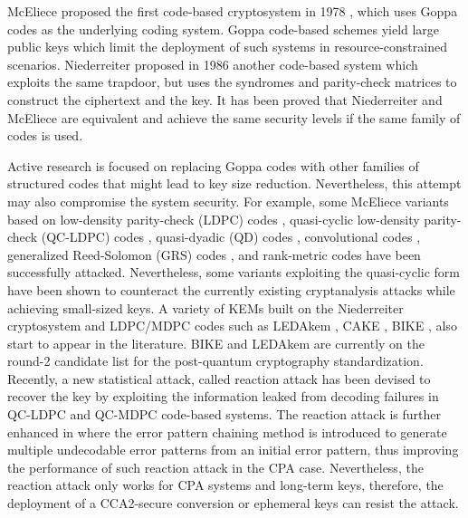 \documentclass[preprint]{iacrtrans}
\begin{document}
McEliece proposed the first code-based cryptosystem in 1978 \cite{mceliece1978public}, which uses  Goppa codes \cite{goppa1970new} as the underlying coding system. Goppa code-based schemes yield large public keys which limit the deployment of such systems in resource-constrained scenarios. Niederreiter proposed in 1986 another code-based system \cite{niederreiter1986knapsack} which exploits the same trapdoor, but uses the syndromes and parity-check matrices to construct the ciphertext and the key. It has been proved that Niederreiter and McEliece are equivalent \cite{li1994equivalence} and achieve the same security levels if the same family of codes is used.

Active research is focused on replacing Goppa codes with other families of structured codes that might lead to key size reduction. Nevertheless, this attempt may also compromise the system security. For example, some McEliece variants based on low-density parity-check (LDPC) codes \cite{monico2000using}, quasi-cyclic low-density parity-check (QC-LDPC) codes \cite{otmani2010cryptanalysis}, quasi-dyadic (QD) codes \cite{misoczki2009compact}, convolutional codes \cite{londahl2012new}, generalized Reed-Solomon (GRS) codes \cite{baldi2016enhanced}, and rank-metric codes \cite{loidreau2017new,gaborit2018polynomial} have been successfully attacked. Nevertheless, some variants exploiting the quasi-cyclic form  \cite{baldi2013optimization,baldi2008new,misoczki2013mdpc} have been shown to counteract the currently existing cryptanalysis attacks while achieving small-sized keys. A variety of KEMs built on the Niederreiter cryptosystem and LDPC/MDPC codes such as LEDAkem \cite{baldi2018ledakem}, CAKE \cite{barreto2017cake}, BIKE \cite{aragon2017bike}, also start to appear in the literature. BIKE and LEDAkem are currently on the round-2 candidate list for the post-quantum cryptography standardization. Recently, a new statistical attack, called reaction attack \cite{fabvsivc2017reaction,guo2016key} has been devised to recover the key by exploiting the information leaked from decoding failures in QC-LDPC and QC-MDPC code-based systems. The reaction attack is further enhanced in \cite{nilsson2019error} where the error pattern chaining method is introduced to generate multiple undecodable error patterns from an initial error pattern, thus improving the performance of such reaction attack in the CPA case. Nevertheless, the reaction attack only works for CPA systems and long-term keys, therefore, the deployment of a CCA2-secure conversion or ephemeral keys can resist the attack.
\end{document}
